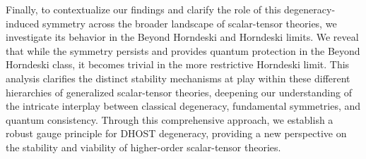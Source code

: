 \documentclass[twocolumn]{aastex631}
\begin{document}
Finally, to contextualize our findings and clarify the role of this degeneracy-induced symmetry across the broader landscape of scalar-tensor theories, we investigate its behavior in the Beyond Horndeski and Horndeski limits. We reveal that while the symmetry persists and provides quantum protection in the Beyond Horndeski class, it becomes trivial in the more restrictive Horndeski limit. This analysis clarifies the distinct stability mechanisms at play within these different hierarchies of generalized scalar-tensor theories, deepening our understanding of the intricate interplay between classical degeneracy, fundamental symmetries, and quantum consistency. Through this comprehensive approach, we establish a robust gauge principle for DHOST degeneracy, providing a new perspective on the stability and viability of higher-order scalar-tensor theories.
\end{document}
